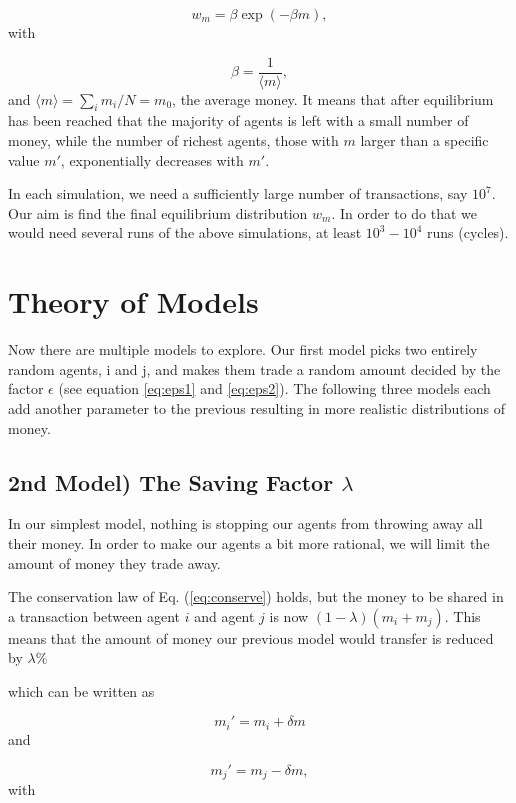 \documentclass[10pt, a4paper]{article}
\begin{document}
\begin{equation*}
w_m=\beta \exp{(-\beta m)},
\end{equation*}
with

\begin{equation*}
\beta = \frac{1}{\langle m\rangle},
\end{equation*}
and $\langle m\rangle=\sum_i m_i/N=m_0$, the average money.
It means that after equilibrium has been reached that the majority of agents is left with a small
number of money, while the number of richest agents, those with $m$ larger than a specific value $m'$,
exponentially decreases with $m'$.

In each simulation, we need a sufficiently large number of transactions, say $10^7$. Our aim is find the final equilibrium distribution $w_m$. In order to do that we would need
several runs of the above simulations, at least $10^3-10^4$ runs (cycles).
\section{Theory of Models}
Now there are multiple models to explore. Our first model picks two entirely random agents, i and j, and makes them trade a random amount decided by the factor $\epsilon$ (see equation \ref{eq:eps1} and \ref{eq:eps2}).
The following three models each add another parameter to the previous resulting in more realistic distributions of money.
\subsection{2nd Model) The Saving Factor $\lambda$}
In our simplest model, nothing is stopping our agents from throwing away all their money. In order to make our agents a bit more rational, we will limit the amount of money they trade away.


The conservation law of Eq. (\ref{eq:conserve}) holds, but the money to be shared in a transaction between
agent $i$ and agent $j$ is now $(1-\lambda)(m_i+m_j)$. This means that the amount of money our previous model would transfer is reduced by $\lambda$\%

which can be written as

\begin{equation}
  m_i'=m_i+\delta m
  \end{equation}
  and

\begin{equation}
  m_j'=m_j-\delta m,
  \end{equation}
  with
\end{document}
